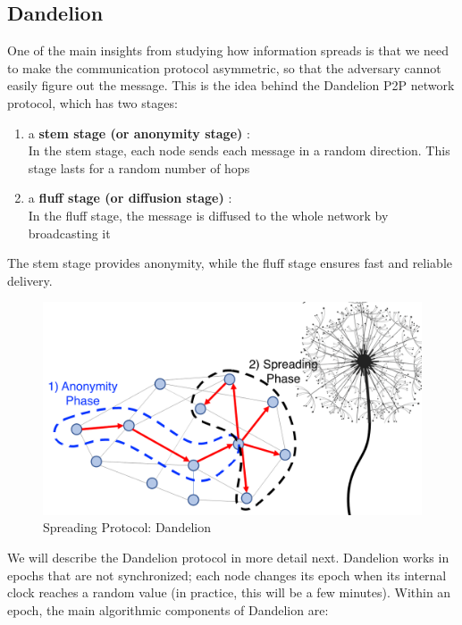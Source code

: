 \subsection{Dandelion}
One of the main insights from studying how information spreads is that we need to make the communication protocol asymmetric, so that the adversary cannot easily figure out the message. This is the idea behind the Dandelion P2P network protocol, which has two stages:
\begin{enumerate}
    \item a \textbf{stem stage (or anonymity stage)} : \\
    In the stem stage, each node sends each message in a random direction. This stage lasts for a random number of hops
    \item a \textbf{fluff stage (or diffusion stage)} : \\
    In the fluff stage, the message is diffused to the whole network by broadcasting it
\end{enumerate} 
The stem stage provides anonymity, while the fluff stage ensures fast and reliable delivery.
\begin{figure}[h!]
    \centering
    \includegraphics[width=0.6\linewidth]{Fig/04/F9}
    \caption{Spreading Protocol: Dandelion}
    \label{fig:f9}
\end{figure}
We will describe the Dandelion protocol in more detail next. Dandelion works in epochs that are not synchronized; each node changes its epoch when its internal clock reaches a random value (in practice, this will be a few minutes). Within an epoch, the main algorithmic components of Dandelion are:
